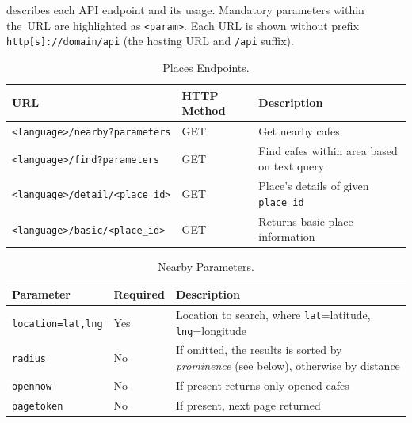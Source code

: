  describes each API endpoint and its usage. Mandatory parameters within the~URL are highlighted as \verb|<param>|. Each URL is shown without prefix \verb|http[s]://domain/api| (the hosting URL and \verb|/api| suffix).
\begin{table}[ht]
\centering
\begin{tabularx}{\textwidth}{|l|l|X|}
\hline
\textbf{URL} & \textbf{HTTP Method} & \textbf{Description} \\ \hline
\verb|<language>/nearby?parameters| & GET & Get nearby cafes \\ \hline
\verb|<language>/find?parameters| & GET & Find cafes within area based on text query \\ \hline
\verb|<language>/detail/<place_id>| & GET & Place's details of given \verb|place_id| \\ \hline
\verb|<language>/basic/<place_id>| & GET & Returns basic place information \\ \hline
\end{tabularx}
\caption{Places Endpoints.}
\label{table:cta-places}
\end{table}
\begin{table}[ht]
\centering
\begin{tabularx}{\textwidth}{|l|l|X|}
\hline
\textbf{Parameter} & \textbf{Required} & \textbf{Description} \\ \hline
\verb|location=lat,lng| & Yes & Location to search, where \verb|lat|=latitude, \verb|lng|=longitude \\ \hline
\verb|radius| & No & If omitted, the results is sorted by \textit{prominence} (see below), otherwise by distance\\ \hline
\verb|opennow| & No & If present returns only opened cafes\\ \hline
\verb|pagetoken| & No & If present, next page returned\\ \hline
\end{tabularx}
\caption{Nearby Parameters.}
\label{table:cta-nearby-params}
\end{table}

